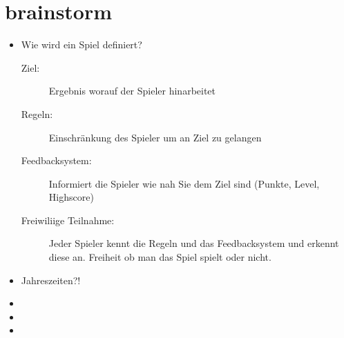 \section{brainstorm}


\begin{itemize}
\item Wie wird ein Spiel definiert?
\begin{description}
\item[Ziel:] Ergebnis worauf der Spieler hinarbeitet
\item[Regeln:] Einschränkung des Spieler um an Ziel zu gelangen
\item[Feedbacksystem:] Informiert die Spieler wie nah Sie dem Ziel sind (Punkte, Level, Highscore)
\item [Freiwiliige Teilnahme:] Jeder Spieler kennt die Regeln und das Feedbacksystem und erkennt diese an. Freiheit ob man das Spiel spielt oder nicht.
\end{description} 
\item  Jahreszeiten?!
\item 
\item 
\item 

\end{itemize}

\newpage

